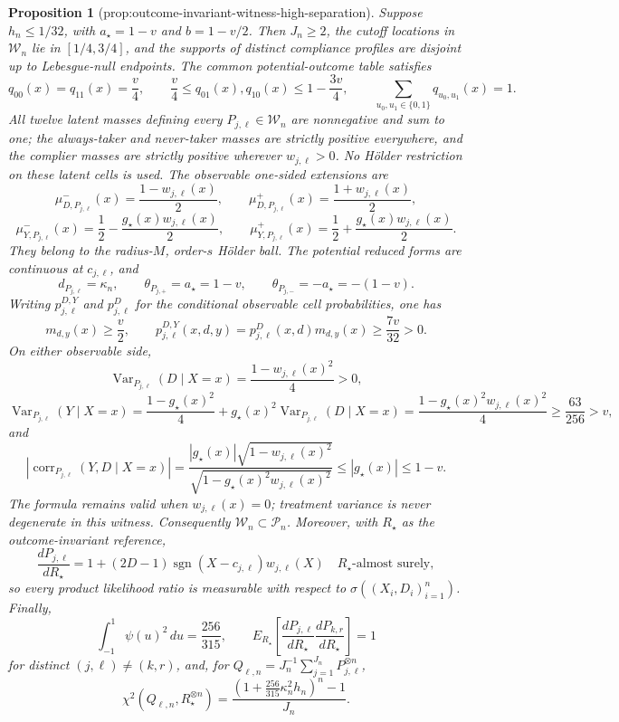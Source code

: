 \documentclass{article}
\newtheorem{proposition}{Proposition}
\begin{document}
\begin{proposition}[prop:outcome-invariant-witness-high-separation]\label{prop:outcome-invariant-witness-high-separation}
Suppose \(h_n\le 1/32\), with \(a_\star=1-v\) and \(b=1-v/2\).  Then \(J_n\ge2\), the cutoff locations in \(\mathcal W_n\) lie in \([1/4,3/4]\), and the supports of distinct compliance profiles are disjoint up to Lebesgue-null endpoints.  The common potential-outcome table satisfies
\[
q_{00}(x)=q_{11}(x)=\frac v4,
\qquad
\frac v4\le q_{01}(x),q_{10}(x)\le1-\frac{3v}{4},
\qquad
\sum_{u_0,u_1\in\{0,1\}}q_{u_0,u_1}(x)=1.
\]
All twelve latent masses defining every \(P_{j,\ell}\in\mathcal W_n\) are nonnegative and sum to one; the always-taker and never-taker masses are strictly positive everywhere, and the complier masses are strictly positive wherever \(w_{j,\ell}>0\).  No H\"older restriction on these latent cells is used.  The observable one-sided extensions are
\[
\mu_{D,P_{j,\ell}}^{-}(x)=\frac{1-w_{j,\ell}(x)}2,
\qquad
\mu_{D,P_{j,\ell}}^{+}(x)=\frac{1+w_{j,\ell}(x)}2,
\]
\[
\mu_{Y,P_{j,\ell}}^{-}(x)=\frac12-\frac{g_\star(x)w_{j,\ell}(x)}2,
\qquad
\mu_{Y,P_{j,\ell}}^{+}(x)=\frac12+\frac{g_\star(x)w_{j,\ell}(x)}2.
\]
They belong to the radius-\(M\), order-\(s\) H\"older ball.  The potential reduced forms are continuous at \(c_{j,\ell}\), and
\[
d_{P_{j,\ell}}=\kappa_n,
\qquad
\theta_{P_{j,+}}=a_\star=1-v,
\qquad
\theta_{P_{j,-}}=-a_\star=-(1-v).
\]
Writing \(p_{j,\ell}^{D,Y}\) and \(p_{j,\ell}^{D}\) for the conditional observable cell probabilities, one has
\[
m_{d,y}(x)\ge\frac v2,
\qquad
p_{j,\ell}^{D,Y}(x,d,y)
=p_{j,\ell}^{D}(x,d)m_{d,y}(x)
\ge\frac{7v}{32}>0.
\]
On either observable side,
\[
\operatorname{Var}_{P_{j,\ell}}(D\mid X=x)=\frac{1-w_{j,\ell}(x)^2}{4}>0,
\]
\[
\operatorname{Var}_{P_{j,\ell}}(Y\mid X=x)
=\frac{1-g_\star(x)^2}{4}
+g_\star(x)^2\operatorname{Var}_{P_{j,\ell}}(D\mid X=x)
=\frac{1-g_\star(x)^2w_{j,\ell}(x)^2}{4}
\ge\frac{63}{256}>v,
\]
and
\[
\left|\operatorname{corr}_{P_{j,\ell}}(Y,D\mid X=x)\right|
=\frac{|g_\star(x)|\sqrt{1-w_{j,\ell}(x)^2}}
       {\sqrt{1-g_\star(x)^2w_{j,\ell}(x)^2}}
\le |g_\star(x)|\le1-v.
\]
The formula remains valid when \(w_{j,\ell}(x)=0\); treatment variance is never degenerate in this witness.  Consequently \(\mathcal W_n\subset\mathcal P_n\).  Moreover, with \(R_\star\) as the outcome-invariant reference,
\[
\frac{dP_{j,\ell}}{dR_\star}
=1+(2D-1)\operatorname{sgn}(X-c_{j,\ell})w_{j,\ell}(X)
\quad R_\star\text{-almost surely},
\]
so every product likelihood ratio is measurable with respect to \(\sigma((X_i,D_i)_{i=1}^n)\).  Finally,
\[
\int_{-1}^{1}\psi(u)^2\,du=\frac{256}{315},
\qquad
E_{R_\star}\!\left[
\frac{dP_{j,\ell}}{dR_\star}
\frac{dP_{k,r}}{dR_\star}
\right]=1
\]
for distinct \((j,\ell)\ne(k,r)\), and, for
\(Q_{\ell,n}=J_n^{-1}\sum_{j=1}^{J_n}P_{j,\ell}^{\otimes n}\),
\[
\chi^2(Q_{\ell,n},R_\star^{\otimes n})
=\frac{\left(1+\frac{256}{315}\kappa_n^2h_n\right)^n-1}{J_n}.
\]
\end{proposition}
\end{document}
